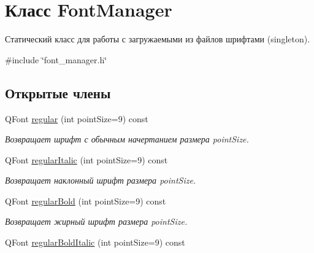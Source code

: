 \hypertarget{class_font_manager}{}\section{Класс Font\+Manager}
\label{class_font_manager}


Статический класс для работы с загружаемыми из файлов шрифтами (singleton).  




{\ttfamily \#include \char`\"{}font\+\_\+manager.\+h\char`\"{}}

\subsection*{Открытые члены}
\begin{DoxyCompactItemize}
\item 
Q\+Font \hyperlink{class_font_manager_aafa7a1714d7024ad5385e40464957ce5}{regular} (int point\+Size=9) const \hypertarget{class_font_manager_aafa7a1714d7024ad5385e40464957ce5}{}\label{class_font_manager_aafa7a1714d7024ad5385e40464957ce5}

\begin{DoxyCompactList}\small\item\em Возвращает шрифт с обычным начертанием размера point\+Size. \end{DoxyCompactList}\item 
Q\+Font \hyperlink{class_font_manager_af984399a96a201c53a0b05b371ad63f9}{regular\+Italic} (int point\+Size=9) const \hypertarget{class_font_manager_af984399a96a201c53a0b05b371ad63f9}{}\label{class_font_manager_af984399a96a201c53a0b05b371ad63f9}

\begin{DoxyCompactList}\small\item\em Возвращает наклонный шрифт размера point\+Size. \end{DoxyCompactList}\item 
Q\+Font \hyperlink{class_font_manager_a32f305f74db5b3c59afdffc69b225cd3}{regular\+Bold} (int point\+Size=9) const \hypertarget{class_font_manager_a32f305f74db5b3c59afdffc69b225cd3}{}\label{class_font_manager_a32f305f74db5b3c59afdffc69b225cd3}

\begin{DoxyCompactList}\small\item\em Возвращает жирный шрифт размера point\+Size. \end{DoxyCompactList}\item 
Q\+Font \hyperlink{class_font_manager_aeca024424eee18e70cbb8582e30241ae}{regular\+Bold\+Italic} (int point\+Size=9) const \hypertarget{class_font_manager_aeca024424eee18e70cbb8582e30241ae}{}\label{class_font_manager_aeca024424eee18e70cbb8582e30241ae}


\end{DoxyCompactItemize}
